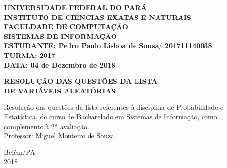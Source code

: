 \thispagestyle{empty}
  \begin{flushleft}
    {\bf{\large{\uppercase{UNIVERSIDADE FEDERAL DO PARÁ} \\}
    \large {\uppercase{INSTITUTO DE CIENCIAS EXATAS E NATURAIS} \\}
    \large {\uppercase{FACULDADE DE COMPUTAÇÃO} \\}
    \large {\uppercase{SISTEMAS DE INFORMAÇÃO} \\}
    \large {\uppercase{ESTUDANTE: } {Pedro Paulo Lisboa de Sousa$\pmb\slash$ 201711140038}} \\
    \large {\uppercase{TURMA: 2017}} \\
    \large {\uppercase{DATA:} 04 de Dezembro de 2018} \\}}
  \end{flushleft}
  \vfill
  \begin{center}
    {\bf{\large{{\uppercase{resolução das questões da lista\\de variáveis aleatórias}}}}}
  \end{center}
  \vfill
  \begin{flushright}
   \begin{minipage}[l]{40ex}
   {\large{Resolução das questões da lista refe\-ren\-tes à disciplina de 
   Probabilidade e Estatística, do curso de Bacharelado 
   em Sistemas de Informação, como complemento à 2ª avaliação. \\[1cm]
   Professor: Miguel Monteiro de Souza}}
   \end{minipage}
  \end{flushright}
  \vfill
  \begin{center}
    \begin{small}
      Belém/PA\\
      2018
    \end{small}
  \end{center}
